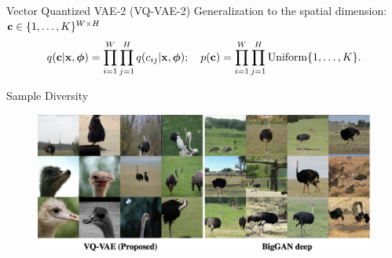 \documentclass{beamer}
\begin{document}
\begin{frame}{Vector Quantized VAE-2  (VQ-VAE-2)}
	Generalization to the spatial dimension: $\mathbf{c} \in \{1, \dots, K\}^{W \times H}$
	\vspace{-0.3cm}
	\[
		q(\mathbf{c} | \mathbf{x}, \boldsymbol{\phi}) = \prod_{i=1}^W \prod_{j=1}^H q(c_{ij} | \mathbf{x}, \boldsymbol{\phi}); \quad p(\mathbf{c}) = \prod_{i=1}^W \prod_{j=1}^H \text{Uniform}\{1, \dots, K\}.
	\]
	\vspace{-0.6cm}
	\begin{block}{Sample Diversity}
		\vspace{-0.2cm}
		\begin{figure}
			\centering
			\includegraphics[width=1.0\linewidth]{figs/vqvae2_diversity}
		\end{figure}
	\end{block}
\end{frame}
\end{document}

